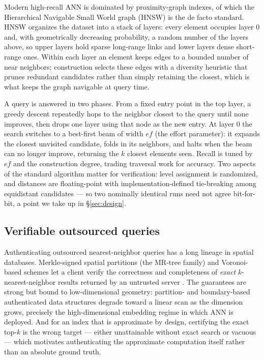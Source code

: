\documentclass[11pt]{article}
\begin{document}
Modern high-recall ANN is dominated by proximity-graph indexes, of which
the Hierarchical Navigable Small World graph (HNSW)
\cite{malkov2018hnsw} is the de facto standard. HNSW organizes the
dataset into a stack of layers: every element occupies layer $0$ and,
with geometrically decreasing probability, a random number of the layers
above, so upper layers hold sparse long-range links and lower layers
dense short-range ones. Within each layer an element keeps edges to a
bounded number of near neighbors; construction selects these edges with
a diversity heuristic that prunes redundant candidates rather than
simply retaining the closest, which is what keeps the graph navigable at
query time.

A query is answered in two phases. From a fixed entry point in the top
layer, a greedy descent repeatedly hops to the neighbor closest to the
query until none improves, then drops one layer using that node as the
new entry. At layer $0$ the search switches to a best-first beam of
width $\mathit{ef}$ (the effort parameter): it expands the closest
unvisited candidate, folds in its neighbors, and halts when the beam can
no longer improve, returning the $k$ closest elements seen. Recall is
tuned by $\mathit{ef}$ and the construction degree, trading traversal
work for accuracy. Two aspects of the standard algorithm matter for
verification: level assignment is randomized, and distances are
floating-point with implementation-defined tie-breaking among
equidistant candidates --- so two nominally identical runs need not
agree bit-for-bit, a point we take up in \S\ref{sec:design}.

\subsection{Verifiable outsourced queries}

Authenticating outsourced nearest-neighbor queries has a long lineage in
spatial databases. Merkle-signed spatial partitions (the MR-tree family)
and Voronoi-based schemes let a client verify the correctness and
completeness of \emph{exact} $k$-nearest-neighbor results returned by an
untrusted server \cite{papadopoulos2011}. The guarantees are strong but
bound to low-dimensional geometry: partition- and boundary-based
authenticated data structures degrade toward a linear scan as the
dimension grows, precisely the high-dimensional embedding regime in
which ANN is deployed. And for an index that is approximate by design,
certifying the exact top-$k$ is the wrong target --- either unattainable
without exact search or vacuous --- which motivates authenticating the
approximate computation itself rather than an absolute ground truth.
\end{document}

